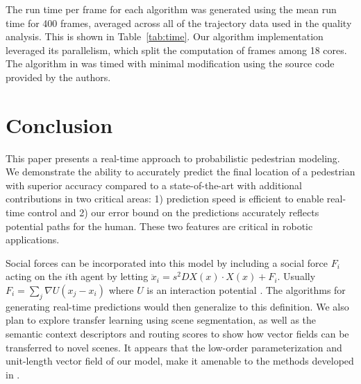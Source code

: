 \documentclass[letterpaper,10pt,conference]{ieeetran}
\begin{document}
The run time per frame for each algorithm was generated using the mean run time for 400 frames, averaged across all of the trajectory data used in the quality analysis.
This is shown in Table~\ref{tab:time}. 
Our algorithm implementation leveraged its parallelism, which split the computation of frames among 18 cores. 
The algorithm in \cite{Kitani2012} was timed with minimal modification using the source code provided by the authors. 


\section{Conclusion} 
\label{sec:conclusion}
This paper presents a real-time approach to probabilistic pedestrian modeling. 
We demonstrate the ability to accurately predict the final location of a pedestrian with superior accuracy compared to a state-of-the-art with additional contributions in two critical areas: 1) prediction speed is efficient to enable real-time control and 2) our error bound on the predictions accurately reflects potential paths for the human. 
These two features are critical in robotic applications.

Social forces can be incorporated into this model by
	including a social force $F_{i}$ acting on the $i$th agent by letting $\ddot{x}_i = s^2 DX(x) \cdot X(x) + F_i$.  
	Usually $F_{i} = \sum_{j} \nabla U( x_j - x_i)$ where $U$ is an interaction potential \cite{Helbing1995}. 
	The algorithms for generating real-time predictions would then generalize to this definition.
	We also plan to explore transfer learning using scene segmentation, as well as the semantic context descriptors and routing scores to show how vector fields can be transferred to novel scenes. It appears that the low-order parameterization and unit-length vector field of our model, make it amenable to the methods developed in \cite{Ballan2016}.
\end{document}
